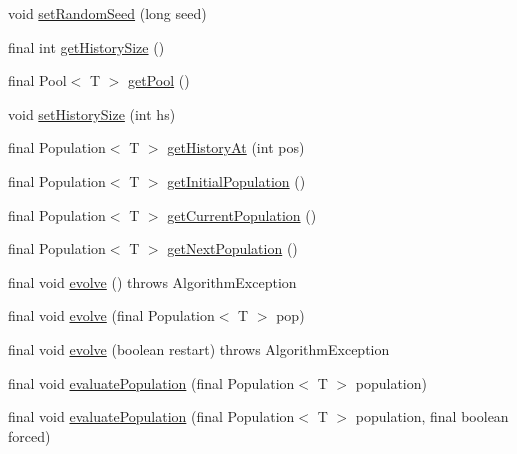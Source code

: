 \begin{DoxyCompactItemize}
\item 
void \hyperlink{classjenes_1_1_genetic_algorithm_3_01_t_01extends_01_chromosome_01_4_a7e5f06abe9e8661cdb38bd0fa663da6c}{set\-Random\-Seed} (long seed)
\item 
final int \hyperlink{classjenes_1_1_genetic_algorithm_3_01_t_01extends_01_chromosome_01_4_ab52be3b0fcd2f424ae191ff4e642edf3}{get\-History\-Size} ()
\item 
final Pool$<$ T $>$ \hyperlink{classjenes_1_1_genetic_algorithm_3_01_t_01extends_01_chromosome_01_4_ad254fc6b2ff476bc7f7837d03e677786}{get\-Pool} ()
\item 
void \hyperlink{classjenes_1_1_genetic_algorithm_3_01_t_01extends_01_chromosome_01_4_a71407144e93e7522d2d474c25781d65c}{set\-History\-Size} (int hs)
\item 
final Population$<$ T $>$ \hyperlink{classjenes_1_1_genetic_algorithm_3_01_t_01extends_01_chromosome_01_4_a99718490498059da48833dfbdfc8076e}{get\-History\-At} (int pos)
\item 
final Population$<$ T $>$ \hyperlink{classjenes_1_1_genetic_algorithm_3_01_t_01extends_01_chromosome_01_4_ab5ff704fa1d7b01bcfc5f0ca36b20e34}{get\-Initial\-Population} ()
\item 
final Population$<$ T $>$ \hyperlink{classjenes_1_1_genetic_algorithm_3_01_t_01extends_01_chromosome_01_4_a855bc56ffb3e1704ced2fdf68cc96d8f}{get\-Current\-Population} ()
\item 
final Population$<$ T $>$ \hyperlink{classjenes_1_1_genetic_algorithm_3_01_t_01extends_01_chromosome_01_4_a5d22b21350638a64a66d3599b2777982}{get\-Next\-Population} ()
\item 
final void \hyperlink{classjenes_1_1_genetic_algorithm_3_01_t_01extends_01_chromosome_01_4_a8afdd855dc891b981cbf675c63db72c3}{evolve} ()  throws Algorithm\-Exception 
\item 
final void \hyperlink{classjenes_1_1_genetic_algorithm_3_01_t_01extends_01_chromosome_01_4_afea32755ac446883e283d2eec6bc69fa}{evolve} (final Population$<$ T $>$ pop)
\item 
final void \hyperlink{classjenes_1_1_genetic_algorithm_3_01_t_01extends_01_chromosome_01_4_af8bb6842d525c274bfb8a3efc9ca5b23}{evolve} (boolean restart)  throws Algorithm\-Exception 
\item 
final void \hyperlink{classjenes_1_1_genetic_algorithm_3_01_t_01extends_01_chromosome_01_4_ab90dc099bae1616275779f59f400a59b}{evaluate\-Population} (final Population$<$ T $>$ population)
\item 
final void \hyperlink{classjenes_1_1_genetic_algorithm_3_01_t_01extends_01_chromosome_01_4_a4a04df077e2b7752248689668889a5a5}{evaluate\-Population} (final Population$<$ T $>$ population, final boolean forced)

\end{DoxyCompactItemize}
